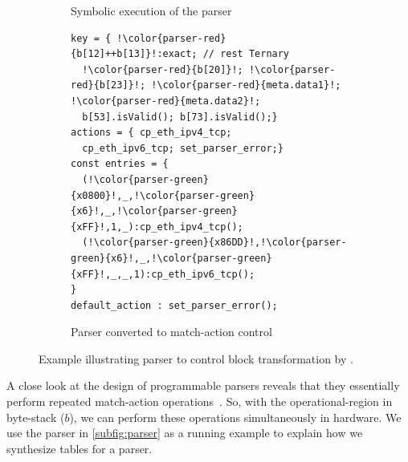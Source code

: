 \documentclass[letterpaper,twocolumn,10pt]{article}
\begin{document}
\begin{figure}[!tb]
\begin{subfigure}[b]{0.26\linewidth}
        \caption{Symbolic execution of the parser}
        \label{subfig:parser-symbolic-execution}
    \end{subfigure}
    \begin{subfigure}[b]{.47\linewidth}
    \centering
    \begin{lstlisting}[frame=none, escapechar=!]
key = { !\color{parser-red}{b[12]++b[13]}!:exact; // rest Ternary
  !\color{parser-red}{b[20]}!; !\color{parser-red}{b[23]}!; !\color{parser-red}{meta.data1}!; !\color{parser-red}{meta.data2}!;
  b[53].isValid(); b[73].isValid();}
actions = { cp_eth_ipv4_tcp;
  cp_eth_ipv6_tcp; set_parser_error;}
const entries = {
  (!\color{parser-green}{x0800}!,_,!\color{parser-green}{x6}!,_,!\color{parser-green}{xFF}!,1,_):cp_eth_ipv4_tcp();
  (!\color{parser-green}{x86DD}!,!\color{parser-green}{x6}!,_,!\color{parser-green}{xFF}!,_,_,1):cp_eth_ipv6_tcp();
}
default_action : set_parser_error();
\end{lstlisting}
\vspace*{-10pt}
\caption{Parser converted to match-action control}
\label{subfig:parser-mat}
\end{subfigure}
\caption{Example illustrating parser to control block transformation
by \ucomp.}
\label{fig:parser-to-control-block-transformation}
\end{figure}

%
A close look at the design of programmable parsers reveals that they
essentially perform repeated match-action operations~\cite{6665172}.
So, with the operational-region in byte-stack ($b$), we can perform
these operations simultaneously in hardware. We use the parser in
\cref{subfig:parser} as a running example to explain how we synthesize
tables for a parser.
\end{document}
